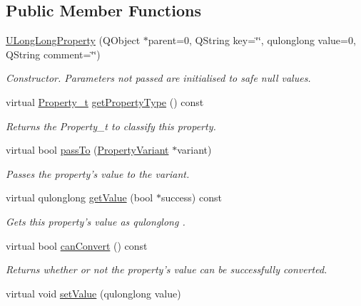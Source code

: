 \subsection*{Public Member Functions}
\begin{DoxyCompactItemize}
\item 
\hyperlink{class_u_long_long_property_a2e62bdd765cd03324aa8abd4c84fb97a}{U\-Long\-Long\-Property} (Q\-Object $\ast$parent=0, Q\-String key=\char`\"{}\char`\"{}, qulonglong value=0, Q\-String comment=\char`\"{}\char`\"{})
\begin{DoxyCompactList}\small\item\em Constructor. Parameters not passed are initialised to safe null values. \end{DoxyCompactList}\item 
virtual \hyperlink{group___property_classes_ga38f1ccddda12c7cb50b868c9f789ee37}{Property\-\_\-t} \hyperlink{class_u_long_long_property_aaad8c3be9d1037f10e7bcd0713a404a9}{get\-Property\-Type} () const 
\begin{DoxyCompactList}\small\item\em Returns the Property\-\_\-t to classify this property. \end{DoxyCompactList}\item 
virtual bool \hyperlink{class_u_long_long_property_a501c2e699537199ef93ba3c765d3c310}{pass\-To} (\hyperlink{class_property_variant}{Property\-Variant} $\ast$variant)
\begin{DoxyCompactList}\small\item\em Passes the property's value to the variant. \end{DoxyCompactList}\item 
virtual qulonglong \hyperlink{class_u_long_long_property_ac2dadcd92de6e92c58620ebfd1e50b66}{get\-Value} (bool $\ast$success) const 
\begin{DoxyCompactList}\small\item\em Gets this property's value as qulonglong . \end{DoxyCompactList}\item 
virtual bool \hyperlink{class_u_long_long_property_a9b670e3778650e496146c24ac133c136}{can\-Convert} () const 
\begin{DoxyCompactList}\small\item\em Returns whether or not the property's value can be successfully converted. \end{DoxyCompactList}\item 
virtual void \hyperlink{class_u_long_long_property_abb1dcbdd5327e7cd261df653dadcc2c9}{set\-Value} (qulonglong value)

\end{DoxyCompactItemize}
